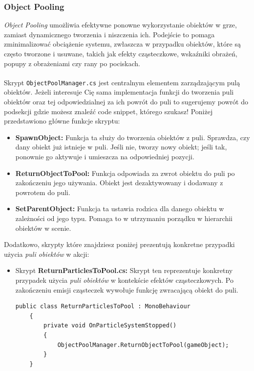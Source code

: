 \subsubsection{Object Pooling}
\textit{Object Pooling} umożliwia efektywne ponowne wykorzystanie obiektów w grze, zamiast dynamicznego tworzenia i niszczenia ich. Podejście to pomaga zminimalizować obciążenie systemu, zwłaszcza w przypadku obiektów, które są często tworzone i usuwane, takich jak efekty cząsteczkowe, wskaźniki obrażeń, popupy z obrażeniami czy rany po pociskach. \\ \\
Skrypt \texttt{ObjectPoolManager.cs} jest centralnym elementem zarządzającym pulą obiektów. Jeżeli interesuje Cię sama implementacja funkcji do tworzenia puli obiektów oraz tej odpowiedzialnej za ich powrót do puli to sugerujemy powrót do podsekcji  gdzie możesz znaleźć code snippet, którego szukasz! Poniżej przedstawiono główne funkcje skryptu:
\begin{itemize}
    \item \textbf{SpawnObject:} Funkcja ta służy do tworzenia obiektów z puli. Sprawdza, czy dany obiekt już istnieje w puli. Jeśli nie, tworzy nowy obiekt; jeśli tak, ponownie go aktywuje i umieszcza na odpowiedniej pozycji.
    \item \textbf{ReturnObjectToPool:} Funkcja odpowiada za zwrot obiektu do puli po zakończeniu jego używania. Obiekt jest dezaktywowany i dodawany z powrotem do puli.
    \item \textbf{SetParentObject:} Funkcja ta ustawia rodzica dla danego obiektu w zależności od jego typu. Pomaga to w utrzymaniu porządku w hierarchii obiektów w scenie.
\end{itemize}
Dodatkowo, skrypty które znajdziesz poniżej prezentują konkretne przypadki użycia \textit{puli obiektów} w akcji: \label{subsubsec:objPoolExamples}
\begin{itemize}
    \item Skrypt \textbf{ReturnParticlesToPool.cs:} Skrypt ten reprezentuje konkretny przypadek użycia \textit{puli obiektów} w kontekście efektów cząsteczkowych. Po zakończeniu emisji cząsteczek wywołuje funkcję zwracającą obiekt do puli.
    \begin{codebox}
    \begin{lstlisting}[language={[Sharp]C}, label={listing:ReturnParticlesToPool.cs}]
    public class ReturnParticlesToPool : MonoBehaviour
    {
        private void OnParticleSystemStopped()
        {
            ObjectPoolManager.ReturnObjectToPool(gameObject);
        }
    }
    \end{lstlisting}
    \end{codebox}
\end{itemize}
